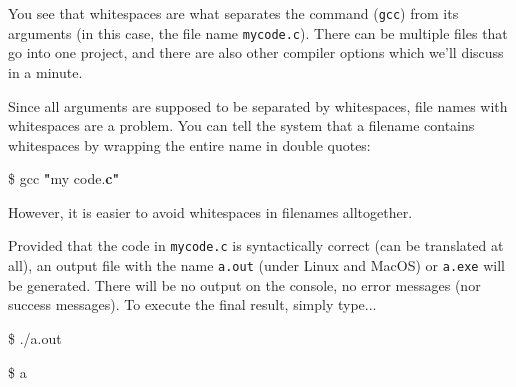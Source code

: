 \begin{warnbox}
You see that whitespaces are what separates the command (\texttt{gcc}) from its arguments (in this case, the file name \texttt{mycode.c}). There can be multiple files that go into one project, and there are also other compiler options which we'll discuss in a minute.

Since all arguments are supposed to be separated by whitespaces, file names with whitespaces are a problem. You can tell the system that a filename contains whitespaces by wrapping the entire name in double quotes:
\begin{cmdbox}
\$ gcc \textbf{"}my code.\textbf{c"}
\end{cmdbox}

However, it is easier to avoid whitespaces in filenames alltogether.
\end{warnbox}

Provided that the code in \texttt{mycode.c} is syntactically correct (\ie can be translated at all), an output file with the name \texttt{a.out} (under Linux and MacOS) or \texttt{a.exe} will be generated. There will be no output on the console, \ie no error messages (nor success messages). To execute the final result, simply type...
\begin{tcbraster}[raster columns=2,
                  raster equal height,
                  nobeforeafter,
                  raster column skip=0.2cm]
\begin{cmdbox}
\$ ./a.out
\end{cmdbox}
%
\begin{cmdbox}
\$ a
\end{cmdbox}
\end{tcbraster}

